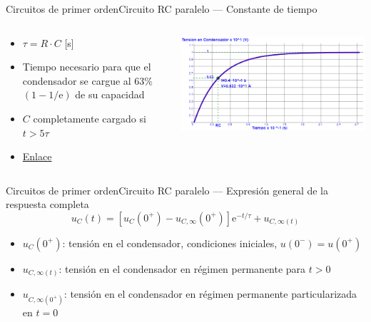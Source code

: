 \documentclass[aspectratio=169, xcolor={usenames,svgnames,dvipsnames}]{beamer}
\begin{document}
\begin{frame}{Circuitos de primer orden}{Circuito RC paralelo --- Constante de tiempo}
\begin{columns}
\begin{column}{0.5\linewidth}
\begin{itemize}
\item \(\tau = R\cdot C\) [s]
\item Tiempo necesario para que el condensador se cargue al 63\% $(1-1/\mathrm{e})$ de su capacidad
\item $C$ completamente cargado si $t>5\tau$
\item \href{https://www.herramientasingenieria.com/onlinecalc/spa/carga-condensadores/carga-condensadores.html}{Enlace}
\end{itemize}
\end{column}
\begin{column}{0.5\linewidth}
\begin{center}
    \includegraphics[width=\linewidth]{../figs/tau_RC.PNG}
\end{center}
\end{column}
\end{columns}

\end{frame}


\begin{frame}{Circuitos de primer orden}{Circuito RC paralelo --- Expresión general de la respuesta completa}
\[
\boxed{u_C(t) = \left[u_C(0^+) - u_{C,\infty}(0^+)\right] \mathrm{e}^{-t/\tau} + u_{C,\infty(t)}}
\]

\begin{itemize}
\item \(u_C(0^+)\): tensión en el condensador, condiciones iniciales, \(u(0^-) = u(0^+)\)
\item \(u_{C,\infty(t)}\): tensión en el condensador en régimen permanente para \(t > 0\)
\item \(u_{C,\infty(0^+)}\): tensión en el condensador en régimen permanente particularizada en \(t = 0\)
\end{itemize}
\end{frame}
\end{document}
